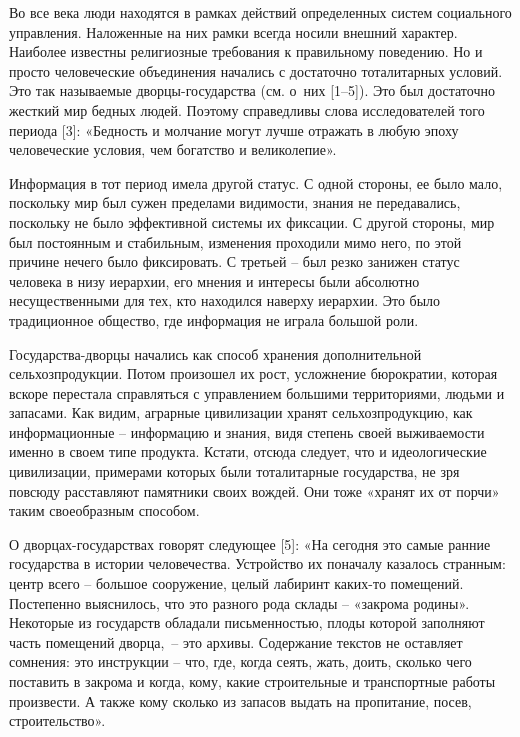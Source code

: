  
 
 
 
 

Во все века люди находятся в рамках действий определенных систем социального
управления. Наложенные на них рамки всегда носили внешний характер. Наиболее
известны религиозные требования к правильному поведению. Но и просто
человеческие объединения начались с достаточно тоталитарных условий. Это так
называемые дворцы-государства (см. о них [1–5]). Это был достаточно жесткий мир
бедных людей. Поэтому справедливы слова исследователей того периода [3]:
«Бедность и молчание могут лучше отражать в любую эпоху человеческие условия,
чем богатство и великолепие».

Информация в тот период имела другой статус. С одной стороны, ее было мало,
поскольку мир был сужен пределами видимости, знания не передавались, поскольку
не было эффективной системы их фиксации. С другой стороны, мир был постоянным и
стабильным, изменения проходили мимо него, по этой причине нечего было
фиксировать. С третьей – был резко занижен статус человека в низу иерархии, его
мнения и интересы были абсолютно несущественными для тех, кто находился наверху
иерархии. Это было традиционное общество, где информация не играла большой
роли.

Государства-дворцы начались как способ хранения дополнительной
сельхозпродукции. Потом произошел их рост, усложнение бюрократии, которая
вскоре перестала справляться с управлением большими территориями, людьми и
запасами. Как видим, аграрные цивилизации хранят сельхозпродукцию, как
информационные – информацию и знания, видя степень своей выживаемости именно в
своем типе продукта. Кстати, отсюда следует, что и идеологические цивилизации,
примерами которых были тоталитарные государства, не зря повсюду расставляют
памятники своих вождей. Они тоже «хранят их от порчи» таким своеобразным
способом.

О дворцах-государствах говорят следующее [5]: «На сегодня это самые ранние
государства в истории человечества. Устройство их поначалу казалось странным:
центр всего – большое сооружение, целый лабиринт каких-то помещений. Постепенно
выяснилось, что это разного рода склады – «закрома родины». Некоторые из
государств обладали письменностью, плоды которой заполняют часть помещений
дворца, – это архивы. Содержание текстов не оставляет сомнения: это инструкции
– что, где, когда сеять, жать, доить, сколько чего поставить в закрома и когда,
кому, какие строительные и транспортные работы произвести. А также кому сколько
из запасов выдать на пропитание, посев, строительство».

